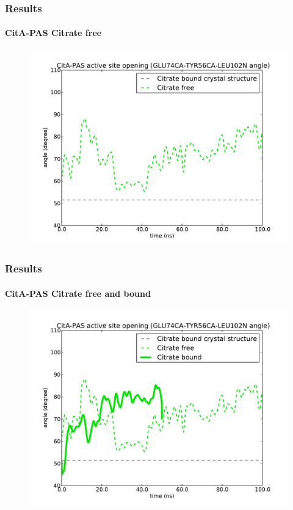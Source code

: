 \documentclass[english]{beamer}
\begin{document}
\begin{frame}
    \frametitle{Results}
    \framesubtitle{CitA-PAS Citrate free}

    \begin{figure}
        \includegraphics[width=.85\linewidth]{figures/MD/angle_citrate_free_GLU74CA-TYR56CA-LEU102N.pdf}
    \end{figure}       
\end{frame}   
 

\begin{frame}
    \frametitle{Results}
    \framesubtitle{CitA-PAS Citrate free and bound}

    \begin{figure}
        \includegraphics[width=.85\linewidth]{figures/MD/angle_both_GLU74CA-TYR56CA-LEU102N.pdf}
    \end{figure}       
\end{frame}   
 
\end{document}
